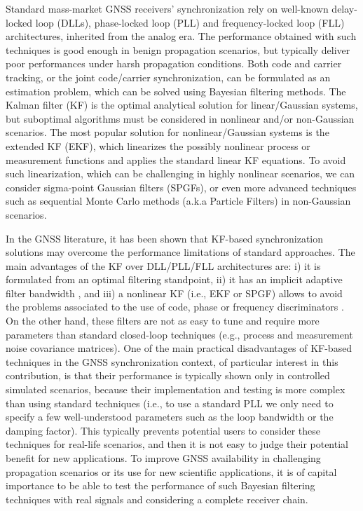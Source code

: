 Standard mass-market GNSS receivers' synchronization rely on well-known delay-locked loop (DLLs), phase-locked loop (PLL) and frequency-locked loop (FLL) architectures, inherited from the analog era. The performance obtained with such techniques is good enough in benign propagation scenarios, but typically deliver poor performances under harsh propagation conditions. Both code and carrier tracking, or the joint code/carrier synchronization, can be formulated as an estimation problem, which can be solved using Bayesian filtering methods. The Kalman filter (KF) is the optimal analytical solution for linear/Gaussian systems, but suboptimal algorithms must be considered in nonlinear and/or non-Gaussian scenarios. The most popular solution for nonlinear/Gaussian systems is the extended KF (EKF), which linearizes the possibly nonlinear process or measurement functions and applies the standard linear KF equations. To avoid such linearization, which can be challenging in highly nonlinear scenarios, we can consider sigma-point Gaussian filters (SPGFs), or even more advanced techniques such as sequential Monte Carlo methods (a.k.a Particle Filters) in non-Gaussian scenarios. 

In the GNSS literature, it has been shown that KF-based synchronization solutions \cite{Vila17c} may overcome the performance limitations of standard approaches. The main advantages of the KF over DLL/PLL/FLL architectures are: i) it is formulated from an optimal filtering standpoint, ii) it has an implicit adaptive filter bandwidth \cite{Vila-14a}, and iii) a nonlinear KF (i.e., EKF or SPGF) allows to avoid the problems associated to the use of code, phase or frequency discriminators \cite{Vila-14b}. On the other hand, these filters are not as easy to tune and require more parameters than standard closed-loop techniques (e.g., process and measurement noise covariance matrices). One of the main practical disadvantages of KF-based techniques in the GNSS synchronization context, of particular interest in this contribution, is that their performance is typically shown only in controlled simulated scenarios, because their implementation and testing is more complex than using standard techniques (i.e., to use a standard PLL we only need to specify a few well-understood parameters such as the loop bandwidth or the damping factor). This typically prevents potential users to consider these techniques for real-life scenarios, and then it is not easy to judge their potential benefit for new applications. To improve GNSS availability in challenging propagation scenarios or its use for new scientific applications, it is of capital importance to be able to test the performance of such Bayesian filtering techniques with real signals and considering a complete receiver chain.


